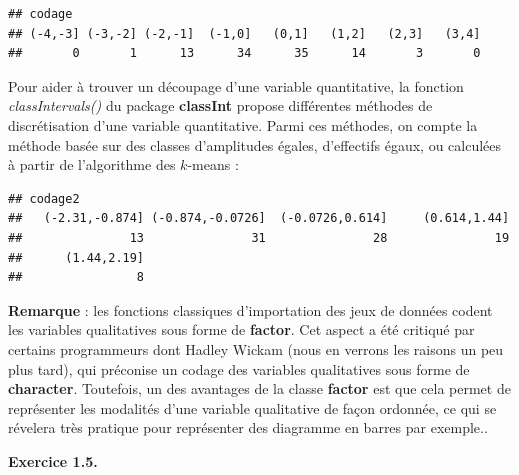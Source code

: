 \documentclass[
]{book}
\newenvironment{Shaded}{\begin{snugshade}}{\end{snugshade}}
\newcommand{\AttributeTok}[1]{\textcolor[rgb]{0.77,0.63,0.00}{#1}}
\newcommand{\DecValTok}[1]{\textcolor[rgb]{0.00,0.00,0.81}{#1}}
\newcommand{\FunctionTok}[1]{\textcolor[rgb]{0.00,0.00,0.00}{#1}}
\newcommand{\NormalTok}[1]{#1}
\newcommand{\OtherTok}[1]{\textcolor[rgb]{0.56,0.35,0.01}{#1}}
\newcommand{\SpecialCharTok}[1]{\textcolor[rgb]{0.00,0.00,0.00}{#1}}
\newcommand{\StringTok}[1]{\textcolor[rgb]{0.31,0.60,0.02}{#1}}
\theoremstyle{definition}
\theoremstyle{definition}
\theoremstyle{definition}
\theoremstyle{definition}
\theoremstyle{remark}
\begin{document}
\begin{verbatim}
## codage
## (-4,-3] (-3,-2] (-2,-1]  (-1,0]   (0,1]   (1,2]   (2,3]   (3,4] 
##       0       1      13      34      35      14       3       0
\end{verbatim}

Pour aider à trouver un découpage d'une variable quantitative, la fonction \emph{classIntervals()} du package \textbf{classInt} propose différentes méthodes de discrétisation d'une variable quantitative. Parmi ces méthodes, on compte la méthode basée sur des classes d'amplitudes égales, d'effectifs égaux, ou calculées à partir de l'algorithme des \(k\)-means :

\begin{Shaded}
\end{Shaded}

\begin{verbatim}
## codage2
##   (-2.31,-0.874] (-0.874,-0.0726]  (-0.0726,0.614]     (0.614,1.44] 
##               13               31               28               19 
##      (1.44,2.19] 
##                8
\end{verbatim}

\textbf{Remarque} : les fonctions classiques d'importation des jeux de données codent les variables qualitatives sous forme de \textbf{factor}. Cet aspect a été critiqué par certains programmeurs dont Hadley Wickam (nous en verrons les raisons un peu plus tard), qui préconise un codage des variables qualitatives sous forme de \textbf{character}. Toutefois, un des avantages de la classe \textbf{factor} est que cela permet de représenter les modalités d'une variable qualitative de façon ordonnée, ce qui se révelera très pratique pour représenter des diagramme en barres par exemple..

\textbf{Exercice 1.5.}
\end{document}

